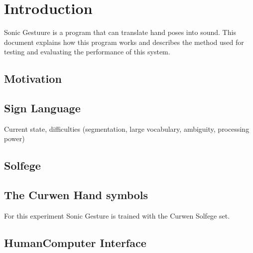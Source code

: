 
\chapter{Introduction}
\label{ch:intro}

Sonic Gestuure is a program that can translate hand poses into sound. This
document explains how this program works and describes the method used for
testing and evaluating the performance of this system.

\section{Motivation}

\section{Sign Language}
Current state, difficulties (segmentation, large vocabulary, ambiguity, processing power)

\section{Solfege}


\section{The Curwen Hand symbols}
For this experiment Sonic Gesture is trained with the Curwen Solfege set\cite{choksy1999}.

\section{Human\-Computer Interface}
